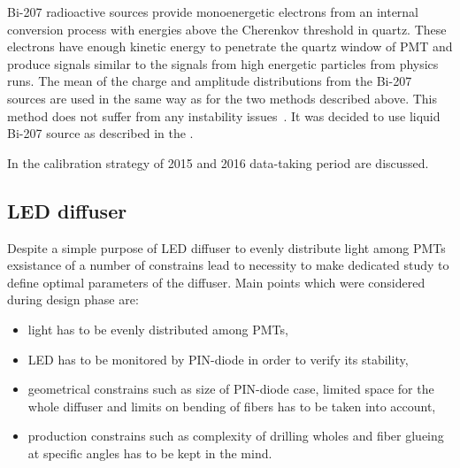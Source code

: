 Bi-207 radioactive sources provide monoenergetic electrons from an internal conversion process with energies 
above the Cherenkov threshold in quartz. These electrons
have enough kinetic energy to penetrate the quartz window of PMT and produce signals similar to the signals 
from high energetic particles from physics runs. The mean of the charge and amplitude 
distributions from the Bi-207 sources are used in the same way as for the two methods described above. 
This method does not suffer from any instability issues~\cite{Alberghi:2016tad}.
It was decided to use liquid Bi-207 source as described in the .

In the  calibration strategy of 2015 and 2016 data-taking period are discussed.

\subsection{LED diffuser}
\label{subsec:LEDDiffuser}





Despite a simple purpose of LED diffuser to evenly distribute light among PMTs exsistance of a number of constrains lead to necessity to make dedicated study 
to define optimal parameters of the diffuser. Main points which were considered during design phase are:
\begin{itemize}
 \item light has to be evenly distributed among PMTs,
 \item LED has to be monitored by PIN-diode in order to verify its stability,
 \item geometrical constrains such as size of PIN-diode case, limited space for the whole diffuser and limits on bending of fibers has to be taken into account,
 \item production constrains such as complexity of drilling wholes and fiber glueing at specific angles has to be kept in the mind.
\end{itemize}

